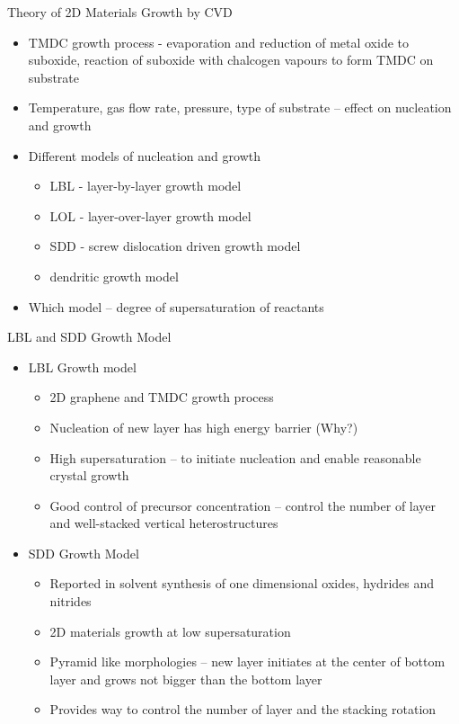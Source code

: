 \documentclass{beamer}
\begin{document}
\begin{frame}{Theory of 2D Materials Growth by CVD}
    \begin{itemize}
        \item TMDC growth process - evaporation and reduction of metal oxide to suboxide, reaction of suboxide with chalcogen vapours to form TMDC on substrate
        \item Temperature, gas flow rate, pressure, type of substrate -- effect on nucleation and growth
        \item Different models of nucleation and growth
        \begin{itemize}
            \item LBL - layer-by-layer growth model
            \item LOL - layer-over-layer growth model
            \item SDD - screw dislocation driven growth model
            \item dendritic growth model
        \end{itemize}
        \item Which model -- degree of supersaturation of reactants
    \end{itemize}
\end{frame}

\begin{frame}{LBL and SDD Growth Model}
    \begin{itemize}
        \item LBL Growth model
        \begin{itemize}
            \item 2D graphene and TMDC growth process
            \item Nucleation of new layer has high energy barrier (Why?)
            \item High supersaturation -- to initiate nucleation and enable reasonable crystal growth
            \item Good control of precursor concentration -- control the number of layer and well-stacked vertical heterostructures
        \end{itemize}
        \item SDD Growth Model
        \begin{itemize}
            \item Reported in solvent synthesis of one dimensional oxides, hydrides and nitrides
            \item 2D materials growth at low supersaturation
            \item Pyramid like morphologies -- new layer initiates at the center of bottom layer and grows not bigger than the bottom layer
            \item Provides way to control the number of layer and the stacking rotation
        \end{itemize}
    \end{itemize}
\end{frame}
\end{document}
